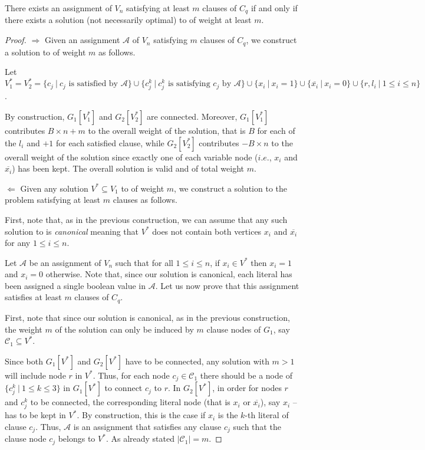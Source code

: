 		\begin{lemma}
 	 	 There exists an assignment of $V_n$ satisfying at least $m$ clauses of $C_q$ if and only if there exists a solution (not necessarily optimal) to \mwccs{} of weight at least $m$.
		\end{lemma}

		\begin{proof}

		{\parindent0pt
		$\boxed\Rightarrow$} Given an assignment $\mathcal{A}$ of $V_n$ satisfying $m$ clauses of $C_q$, we construct a solution to \mwccs{} of weight $m$ as follows.

		Let $V_1^*=V_2^*=\{c_j~\vert~ c_j \text{ is satisfied by } \mathcal{A}\} \cup \{c^k_j~\vert~ c^k_j \text{ is satisfying } c_j \text{ by } \mathcal{A}\}\cup\{x_i~\vert~ x_i=1\}\cup\{\overline{x_i}~\vert~ x_i=0\}\cup \{r,l_i~\vert~ 1\leq i\leq n\}$. 

		By construction, $G_1[V_1^*]$ and $G_2[V_2^*]$ are connected. Moreover, $G_1[V_1^*]$ contributes $B\times n+m$ to the overall weight of the solution, that is $B$ for each of the $l_i$ and $+1$ for each satisfied clause, while $G_2[V_2^*]$ contributes $-B\times n$ to the overall weight of the solution since exactly one of each variable node ($i.e.$, $x_i$ and $\overline{x_i}$) has been kept. The overall solution is valid and of total weight $m$.

		\vspace*{1em}
		{\parindent0pt
		$\boxed{\Leftarrow}$} Given any solution $V^*\subseteq V_1$ to \mwccs{} of weight $m$, we construct a solution to the \msat{} problem satisfying at least $m$ clauses as follows.

		First, note that, as in the previous construction, we can assume that any such solution to \mwccs{} is \textit{canonical} meaning that $V^*$ does not contain both vertices $x_i$ and $\overline{x_i}$ for any $1\leq i\leq n$.

		Let $\mathcal{A}$ be an assignment of $V_n$ such that for all $1\leq i\leq n$, if $x_i\in V^*$ then $x_i=1$ and $x_i=0$ otherwise. Note that, since our solution is canonical, each literal has been assigned a single boolean value in $\mathcal{A}$. Let us now prove that this assignment satisfies at least $m$ clauses of $C_q$.

		First, note that since our solution is canonical, as in the previous construction, the weight $m$ of the solution can only be induced by $m$ clause nodes of $G_1$, say $\mathcal{C}_1\subseteq V^*$.

		Since both $G_1[V^*]$ and $G_2[V^*]$ have to be connected, any solution with $m>1$ will include node $r$ in $V^*$. Thus, for each node $c_j\in\mathcal{C}_1$ there should be a node of $\{c_j^k ~\vert~ 1\leq k\leq 3\}$ in $G_1[V^*]$ to connect $c_j$ to $r$. In $G_2[V^*]$, in order for nodes $r$ and $c_j^k$ to be connected, the corresponding literal node (that is $x_i$ or $\overline{x_i}$), say $x_i$ -- has to be kept in $V^*$. By construction, this is the case if $x_i$ is the $k$-th literal of clause $c_j$. Thus, $\mathcal{A}$ is an assignment that satisfies any clause $c_j$ such that the clause node $c_j$ belongs to $V^*$. As already stated $|\mathcal{C}_1|=m$.
		\end{proof}

